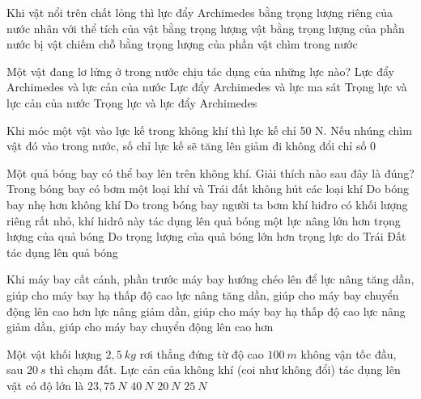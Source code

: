 \begin{ex}%
Khi vật nổi trên chất lỏng thì lực đẩy Archimedes
\choice
{bằng trọng lượng riêng của nước nhân với thể tích của vật}
{bằng trọng lượng vật}
{\True bằng trọng lượng của phần nước bị vật chiếm chỗ}
{bằng trọng lượng của phần vật chìm trong nước}
\loigiai{}
 \end{ex}
\begin{ex}%
Một vật đang lơ lửng ở trong nước chịu tác dụng của những lực nào?
\choice
{Lực đẩy Archimedes và lực cản của nước}
{Lực đẩy Archimedes và lực ma sát}
{Trọng lực và lực cản của nước}
{\True Trọng lực và lực đẩy Archimedes}
\end{ex}
\begin{ex}%
Khi móc một vật vào lực kế trong không khí thì lực kế chỉ 50 N. Nếu nhúng chìm vật đó vào trong nước, số chỉ lực kế sẽ
\choice
{tăng lên}
{\True giảm đi}
{không đổi}
{chỉ số $0$}
\loigiai{}
 \end{ex}
\begin{ex}%
Một quả bóng bay có thể bay lên trên không khí. Giải thích nào sau đây là đúng?
\choice
{Trong bóng bay có bơm một loại khí và Trái đất không hút các loại khí}
{Do bóng bay nhẹ hơn không khí}
{\True Do trong bóng bay người ta bơm khí hiđro có khối lượng riêng rất nhỏ, khí hidrô này tác dụng lên quả bóng một lực nâng lớn hơn trọng lượng của quả bóng}
{Do trọng lượng của quả bóng lớn hơn trọng lực do Trái Đất tác dụng lên quả bóng}
\loigiai{}
 \end{ex}
\begin{ex}%
Khi máy bay cất cánh, phần trước máy bay hướng chéo lên để
\choice
{lực nâng tăng dần, giúp cho máy bay hạ thấp độ cao}
{\True lực nâng tăng dần, giúp cho máy bay chuyển động lên cao hơn}
{lực nâng giảm dần, giúp cho máy bay hạ thấp độ cao}
{lực nâng giảm dần, giúp cho máy bay chuyển động lên cao hơn}
\loigiai{}
 \end{ex}
\begin{ex}%
Một vật khối lượng $2,5\ kg$ rơi thẳng đứng từ độ cao $100\ m$ không vận tốc đầu, sau $20\ s$ thì chạm đất. Lực cản của không khí (coi như không đổi) tác dụng lên vật có độ lớn là
\choice
{\True $23,75\ N$}
{$40\ N$}
{$20\ N$}
{$25\ N$}
\end{ex}
